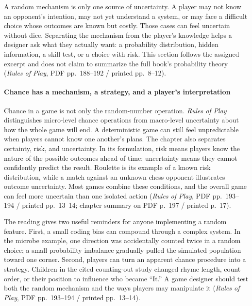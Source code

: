 A random mechanism is only one source of uncertainty. A player may not know an opponent's intention, may not yet understand a system, or may face a difficult choice whose outcomes are known but costly. Those cases can feel uncertain without dice. Separating the mechanism from the player's knowledge helps a designer ask what they actually want: a probability distribution, hidden information, a skill test, or a choice with risk. This section follows the assigned excerpt and does not claim to summarize the full book's probability theory (\emph{Rules of Play}, PDF pp.~188--192 / printed pp.~8--12).

\paragraph{Chance has a mechanism, a strategy, and a player's interpretation}\label{05-engine-i-ch009-chance-has-a-mechanism-a-strategy-and-a-players-interpretation}

Chance in a game is not only the random-number operation. \emph{Rules of Play} distinguishes micro-level chance operations from macro-level uncertainty about how the whole game will end. A deterministic game can still feel unpredictable when players cannot know one another's plans. The chapter also separates certainty, risk, and uncertainty. In its formulation, risk means players know the nature of the possible outcomes ahead of time; uncertainty means they cannot confidently predict the result. Roulette is its example of a known risk distribution, while a match against an unknown chess opponent illustrates outcome uncertainty. Most games combine these conditions, and the overall game can feel more uncertain than one isolated action (\emph{Rules of Play}, PDF pp.~193--194 / printed pp.~13--14; chapter summary on PDF p.~197 / printed p.~17).

The reading gives two useful reminders for anyone implementing a random feature. First, a small coding bias can compound through a complex system. In the microbe example, one direction was accidentally counted twice in a random choice; a small probability imbalance gradually pulled the simulated population toward one corner. Second, players can turn an apparent chance procedure into a strategy. Children in the cited counting-out study changed rhyme length, count order, or their position to influence who became ``It.'' A game designer should test both the random mechanism and the ways players may manipulate it (\emph{Rules of Play}, PDF pp.~193--194 / printed pp.~13--14).

